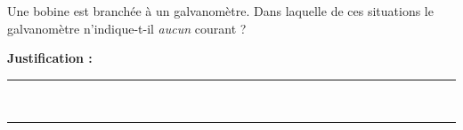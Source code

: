 Une bobine est branchée à un galvanomètre. Dans laquelle de ces situations le galvanomètre n'indique-t-il \emph{aucun} courant ?

\choices

\noindent\textbf{Justification :} \hrulefill \\[2.5ex]
\rule{\linewidth}{0.4pt} \\[2.5ex]
\rule{\linewidth}{0.4pt}
\vfill
